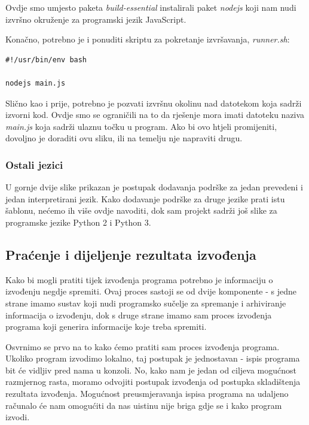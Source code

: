 \documentclass[times, utf8, zavrsni]{fer}
\begin{document}
Ovdje smo umjesto paketa {\textit{build-essential}} instalirali paket {\textit{nodejs}} koji nam nudi izvršno okruženje za programski jezik JavaScript.

Konačno, potrebno je i ponuditi skriptu za pokretanje izvršavanja, {\textit{runner.sh}}:

\begin{lstlisting}
#!/usr/bin/env bash

nodejs main.js
\end{lstlisting}

Slično kao i prije, potrebno je pozvati izvršnu okolinu nad datotekom koja sadrži izvorni kod. Ovdje smo se ograničili na to da rješenje mora imati datoteku naziva {\textit{main.js}} koja sadrži ulaznu točku u program. Ako bi ovo htjeli promijeniti, dovoljno je doraditi ovu sliku, ili na temelju nje napraviti drugu.

\subsubsection{Ostali jezici}

U gornje dvije slike prikazan je postupak dodavanja podrške za jedan prevedeni i jedan interpretirani jezik. Kako dodavanje podrške za druge jezike prati istu šablonu, nećemo ih više ovdje navoditi, dok sam projekt sadrži još slike za programske jezike Python 2 i Python 3.

\subsection{Praćenje i dijeljenje rezultata izvođenja}

Kako bi mogli pratiti tijek izvođenja programa potrebno je informaciju o izvođenju negdje spremiti. Ovaj proces sastoji se od dvije komponente - s jedne strane imamo sustav koji nudi programsko sučelje za spremanje i arhiviranje informacija o izvođenju, dok s druge strane imamo sam proces izvođenja programa koji generira informacije koje treba spremiti.

Osvrnimo se prvo na to kako ćemo pratiti sam proces izvođenja programa. Ukoliko program izvodimo lokalno, taj postupak je jednostavan - ispis programa bit će vidljiv pred nama u konzoli. No, kako nam je jedan od ciljeva mogućnost razmjernog rasta, moramo odvojiti postupak izvođenja od postupka skladištenja rezultata izvođenja. Mogućnost preusmjeravanja ispisa programa na udaljeno računalo će nam omogućiti da nas uistinu nije briga gdje se i kako program izvodi.
\end{document}
